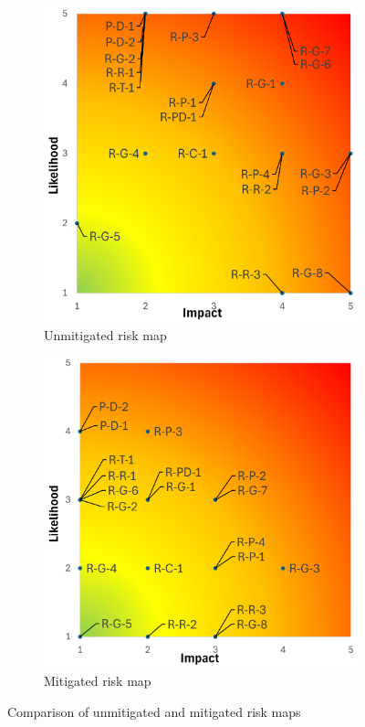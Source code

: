 \begin{figure}[ht]
    \centering
    \begin{subfigure}[b]{0.45\linewidth}
        \centering
        \includegraphics[width=\linewidth]{figures/Risk_map_unmitigated.png}
        \caption{Unmitigated risk map}
        \label{fig:unmitigated}
    \end{subfigure}
    \hspace{0.05\linewidth} %
    \begin{subfigure}[b]{0.45\linewidth}
        \centering
        \includegraphics[width=\linewidth]{figures/Risk_map_mitigated.png}
        \caption{Mitigated risk map}
        \label{fig:mitigated}
    \end{subfigure}
    \caption{Comparison of unmitigated and mitigated risk maps}
    \label{fig:riskmaps}
\end{figure}